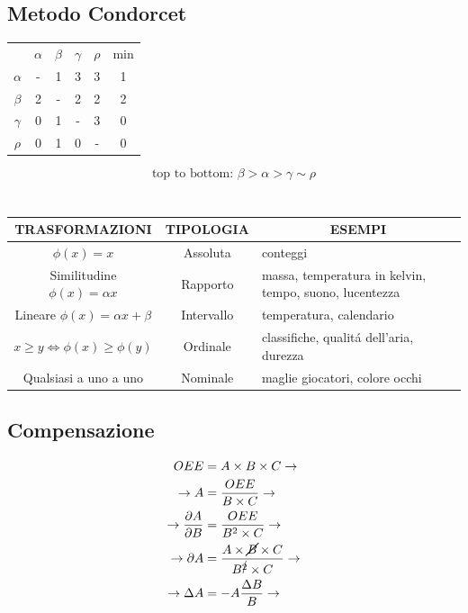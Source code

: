 \documentclass[fontsize=8pt]{scrartcl}
\newcommand{\mysection}[1]{
    \setlength\fboxsep{4pt} %
    \section*{\colorbox{black}{\makebox[\linewidth][l]{\color{white}#1\hfill}}}
}
\begin{document}
\begin{multicols*}{2}
\subsection*{Metodo Condorcet}

\begin{center}
    \begin{tabular}{c c c c c|c}
                    & \(\alpha\)  & \(\beta\) & \(\gamma\)& \(\rho\) & min\\
            \(\alpha\)  & - & 1 & 3 & 3 & 1\\
            \(\beta\)   & 2 & - & 2 & 2 & 2\\
            \(\gamma\)  & 0 & 1 & - & 3 & 0\\
            \(\rho\)    & 0 & 1 & 0 & - & 0\\
    \end{tabular}
    \begin{equation*}
        \text{top to bottom: } \beta > \alpha > \gamma \sim \rho
    \end{equation*}
\end{center}

\mysection{SCALE}
\begin{center}
    \begin{tabularx}{\linewidth}{|c|c|X|}
        \hline
       TRASFORMAZIONI & TIPOLOGIA & \multicolumn{1}{c|}{ESEMPI} \\\hline
       \(\phi (x)=x\) & Assoluta & conteggi\\\hline
       \makecell{Similitudine \\ \(\phi (x)=\alpha x\)} & Rapporto & massa, temperatura in kelvin, tempo, suono, lucentezza\\\hline
       \makecell{Lineare \\ \(\phi (x)=\alpha x + \beta\)} & Intervallo & temperatura, calendario\\\hline
       \(x \geq y \Leftrightarrow \phi(x)\geq\phi(y)\) & Ordinale & classifiche, qualitá dell'aria, durezza\\\hline
       Qualsiasi a uno a uno & Nominale & maglie giocatori, colore occhi\\\hline
    \end{tabularx}
\end{center}

\subsection*{Compensazione}
\begin{align*}
    OEE &= A\times B\times C \rightarrow\\
   \rightarrow A&=\frac{OEE}{B\times C} \rightarrow\\
   \rightarrow \frac{\partial A}{\partial B}&=\frac{OEE}{B^2\times C} \rightarrow\\
   \rightarrow \partial A&=\frac{A\times \cancel{B} \times C}{B^{\cancel{2}}\times C} \rightarrow\\
   \rightarrow \Delta A&=-A\frac{\Delta B}{B} \rightarrow\\
\end{align*}


\end{multicols*}
\end{document}
